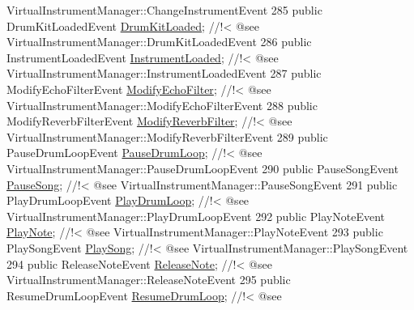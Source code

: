\begin{DoxyCodeInclude}
{       VirtualInstrumentManager::ChangeInstrumentEvent}
285 \textcolor{comment}{}    \textcolor{keyword}{public} DrumKitLoadedEvent          \hyperlink{group___v_i_m_events_ga2dea060b2fba524166433300113dc281}{DrumKitLoaded}; \textcolor{comment}{//!< @see
       VirtualInstrumentManager::DrumKitLoadedEvent}
286 \textcolor{comment}{}    \textcolor{keyword}{public} InstrumentLoadedEvent       \hyperlink{group___v_i_m_events_gad79b789b020d7e4a8c149ec653c0b97f}{InstrumentLoaded}; \textcolor{comment}{//!< @see
       VirtualInstrumentManager::InstrumentLoadedEvent}
287 \textcolor{comment}{}    \textcolor{keyword}{public} ModifyEchoFilterEvent       \hyperlink{group___v_i_m_events_ga112ed15f48fd261f1ad71c3c953c0a58}{ModifyEchoFilter}; \textcolor{comment}{//!< @see
       VirtualInstrumentManager::ModifyEchoFilterEvent}
288 \textcolor{comment}{}    \textcolor{keyword}{public} ModifyReverbFilterEvent     \hyperlink{group___v_i_m_events_gaadd137e073cb3849f610a46e0d032858}{ModifyReverbFilter}; \textcolor{comment}{//!< @see
       VirtualInstrumentManager::ModifyReverbFilterEvent}
289 \textcolor{comment}{}    \textcolor{keyword}{public} PauseDrumLoopEvent          \hyperlink{group___v_i_m_events_ga6de00a430321852cc3c8c4a213d62c70}{PauseDrumLoop}; \textcolor{comment}{//!< @see
       VirtualInstrumentManager::PauseDrumLoopEvent}
290 \textcolor{comment}{}    \textcolor{keyword}{public} PauseSongEvent              \hyperlink{group___v_i_m_events_gae2d76fc98161d7a4573628dbd93e7887}{PauseSong}; \textcolor{comment}{//!< @see
       VirtualInstrumentManager::PauseSongEvent}
291 \textcolor{comment}{}    \textcolor{keyword}{public} PlayDrumLoopEvent           \hyperlink{group___v_i_m_events_ga5657ff4bcc7de6d240d7092ffd22a6fe}{PlayDrumLoop}; \textcolor{comment}{//!< @see
       VirtualInstrumentManager::PlayDrumLoopEvent}
292 \textcolor{comment}{}    \textcolor{keyword}{public} PlayNoteEvent               \hyperlink{group___v_i_m_events_gaa21021c13a8c9d13cbf374d5bf9d68fa}{PlayNote}; \textcolor{comment}{//!< @see VirtualInstrumentManager::PlayNoteEvent}
293 \textcolor{comment}{}    \textcolor{keyword}{public} PlaySongEvent               \hyperlink{group___v_i_m_events_gae450bdba9c513ab4e43f69def50fa84d}{PlaySong}; \textcolor{comment}{//!< @see VirtualInstrumentManager::PlaySongEvent}
294 \textcolor{comment}{}    \textcolor{keyword}{public} ReleaseNoteEvent            \hyperlink{group___v_i_m_events_ga3a1726a6366126421434c2c7be5e5678}{ReleaseNote}; \textcolor{comment}{//!< @see
       VirtualInstrumentManager::ReleaseNoteEvent}
295 \textcolor{comment}{}    \textcolor{keyword}{public} ResumeDrumLoopEvent         \hyperlink{group___v_i_m_events_ga54db2dc24076cd3cd130e95c2fd5bea0}{ResumeDrumLoop}; \textcolor{comment}{//!< @see
}
\end{DoxyCodeInclude}
